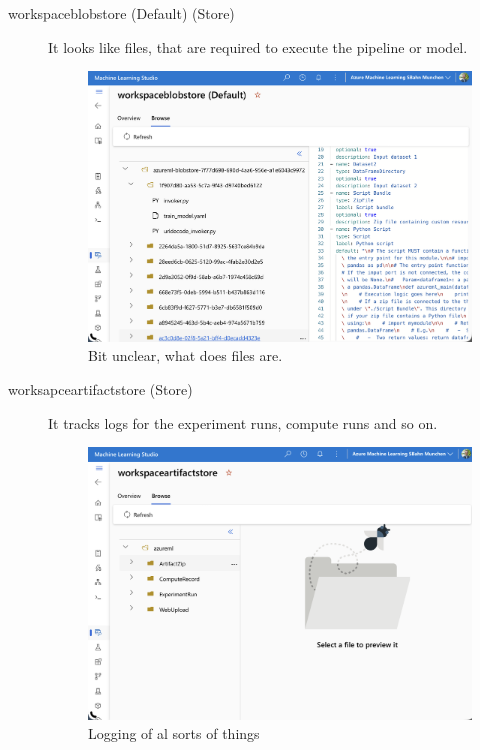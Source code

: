 \begin{description}
	\item[workspaceblobstore (Default) (Store)] It looks like files, that are required to execute the pipeline or model.
	\begin{figure}[H]
		\centering
		\includegraphics[scale = 0.3]{attachment/chapter_10/Scc041}
		\caption{Bit unclear, what does files are.}
	\end{figure}
	\item[worksapceartifactstore (Store)] It tracks logs for the experiment runs, compute runs and so on.
		\begin{figure}[H]
		\centering
		\includegraphics[scale = 0.3]{attachment/chapter_10/Scc040}
		\caption{Logging of al sorts of things}
	\end{figure}
\end{description}

